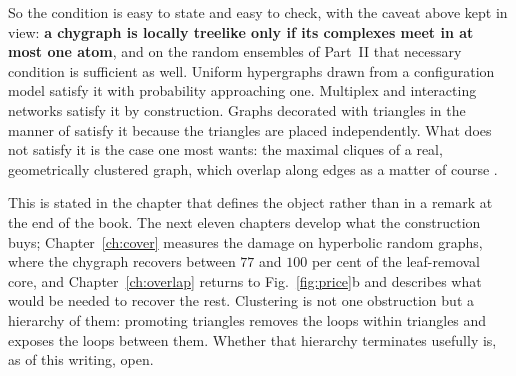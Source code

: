 So the condition is easy to state and easy to check, with the caveat above kept
in view: \textbf{a chygraph is locally treelike only if its complexes meet in at
most one atom}, and on the random ensembles of Part~II that necessary condition
is sufficient as well. Uniform
hypergraphs drawn from a configuration model satisfy it with probability
approaching one. Multiplex and interacting networks satisfy it by construction.
Graphs decorated with triangles in the manner of \citet{newman2009} satisfy it
because the triangles are placed independently. What does not satisfy it is the
case one most wants: the maximal cliques of a real, geometrically clustered
graph, which overlap along edges as a matter of course
\citep{friedrich2015}.

This is stated in the chapter that defines the object rather than in a remark
at the end of the book. The next eleven chapters develop what the construction
buys; Chapter~\ref{ch:cover} measures the damage on hyperbolic random graphs,
where the chygraph recovers between $77$ and $100$ per cent of the leaf-removal
core, and Chapter~\ref{ch:overlap} returns to Fig.~\ref{fig:price}b and
describes what would be needed to recover the rest. Clustering
is not one obstruction but a hierarchy of them: promoting
triangles removes the loops within triangles and exposes the loops between them.
Whether that hierarchy terminates usefully is, as of this writing, open.
